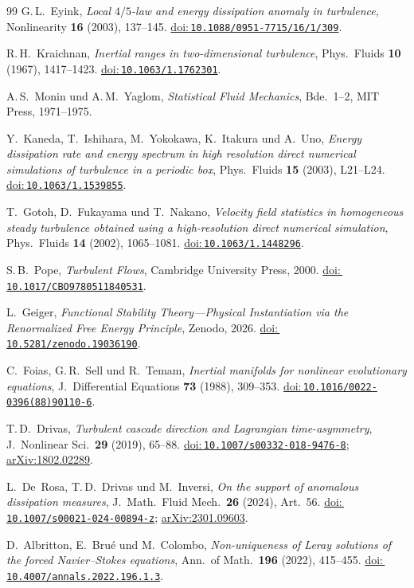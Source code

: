 \documentclass[12pt,a4paper]{article}
\newcommand{\doilink}[1]{\href{https://doi.org/#1}{doi:\,\nolinkurl{#1}}}
\theoremstyle{breakdef}
\theoremstyle{breakplain}
\theoremstyle{breakdef}
\begin{document}
\begin{thebibliography}{99}
G.\,L.~Eyink,
\emph{Local $4/5$-law and energy dissipation anomaly in turbulence},
Nonlinearity \textbf{16} (2003), 137--145.
\doilink{10.1088/0951-7715/16/1/309}.

R.\,H.~Kraichnan,
\emph{Inertial ranges in two-dimensional turbulence},
Phys.\ Fluids \textbf{10} (1967), 1417--1423.
\doilink{10.1063/1.1762301}.

A.\,S.~Monin und A.\,M.~Yaglom,
\emph{Statistical Fluid Mechanics}, Bde.~1--2,
MIT Press, 1971--1975.

Y.~Kaneda, T.~Ishihara, M.~Yokokawa, K.~Itakura und A.~Uno,
\emph{Energy dissipation rate and energy spectrum in high resolution
direct numerical simulations of turbulence in a periodic box},
Phys.\ Fluids \textbf{15} (2003), L21--L24.
\doilink{10.1063/1.1539855}.

T.~Gotoh, D.~Fukayama und T.~Nakano,
\emph{Velocity field statistics in homogeneous steady turbulence
obtained using a high-resolution direct numerical simulation},
Phys.\ Fluids \textbf{14} (2002), 1065--1081.
\doilink{10.1063/1.1448296}.

S.\,B.~Pope,
\emph{Turbulent Flows},
Cambridge University Press, 2000.
\doilink{10.1017/CBO9780511840531}.

L.~Geiger, \emph{Functional Stability Theory---Physical Instantiation via the Renormalized Free Energy Principle},
Zenodo, 2026.
\doilink{10.5281/zenodo.19036190}.

C.~Foias, G.\,R.~Sell und R.~Temam,
\emph{Inertial manifolds for nonlinear evolutionary equations},
J.~Differential Equations \textbf{73} (1988), 309--353.
\doilink{10.1016/0022-0396(88)90110-6}.

T.\,D.~Drivas,
\emph{Turbulent cascade direction and Lagrangian time-asymmetry},
J.~Nonlinear Sci.\ \textbf{29} (2019), 65--88.
\doilink{10.1007/s00332-018-9476-8};
\href{https://arxiv.org/abs/1802.02289}{arXiv:1802.02289}.

L.~De~Rosa, T.\,D.~Drivas und M.~Inversi,
\emph{On the support of anomalous dissipation measures},
J.~Math.\ Fluid Mech.\ \textbf{26} (2024), Art.~56.
\doilink{10.1007/s00021-024-00894-z};
\href{https://arxiv.org/abs/2301.09603}{arXiv:2301.09603}.

D.~Albritton, E.~Brué und M.~Colombo,
\emph{Non-uniqueness of Leray solutions of the forced Navier--Stokes equations},
Ann.\ of Math.\ \textbf{196} (2022), 415--455.
\doilink{10.4007/annals.2022.196.1.3}.


\end{thebibliography}
\end{document}
